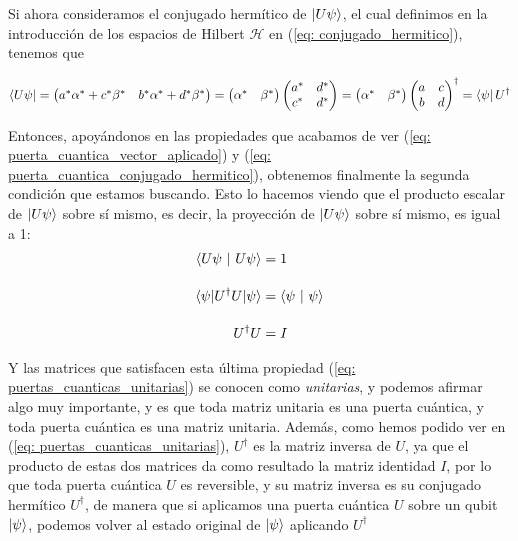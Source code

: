 \documentclass[12pt]{article}
\numberwithin{equation}{section} %
\begin{document}
    \vspace{2.5mm}

    Si ahora consideramos el conjugado hermítico de \( \ket{U \psi} \), el cual definimos en la introducción de los espacios de Hilbert \( \mathcal{H} \) en (\ref{eq: conjugado_hermitico}), tenemos que

    \begin{equation}
        \bra{U \psi} = \begin{pmatrix}
            a^{*} \alpha^{*} + c^{*} \beta^{*} & b^{*} \alpha^{*} + d^{*} \beta^{*} 
        \end{pmatrix} = \begin{pmatrix}
            \alpha^{*} & \beta^{*}
        \end{pmatrix} \begin{pmatrix}
            a^{*} & d^{*} \\
            c^{*} & d^{*}
        \end{pmatrix} = \begin{pmatrix}
            \alpha^{*} & \beta^{*}
        \end{pmatrix} \begin{pmatrix}
            a & c \\
            b & d
        \end{pmatrix} ^ {\dagger} = \bra{\psi} U^{\dagger}
    \label{eq: puerta_cuantica_conjugado_hermitico}
    \end{equation}

    \vspace{2.5mm}

    Entonces, apoyándonos en las propiedades que acabamos de ver (\ref{eq: puerta_cuantica_vector_aplicado}) y (\ref{eq: puerta_cuantica_conjugado_hermitico}), obtenemos finalmente la segunda condición que estamos buscando. Esto lo hacemos viendo que el producto escalar de \( \ket{U \psi} \) sobre sí mismo, es decir, la proyección de \( \ket{U \psi} \) sobre sí mismo, es igual a 1:
    \begin{align}
        \braket{U \psi \ | \ U \psi} &= 1 \nonumber \\[10pt]
        \braket{\psi | U^{\dagger} U | \psi} &= \braket{\psi \ | \ \psi} \nonumber \\[10pt]
        U^{\dagger} U &= I
        \label{eq: puertas_cuanticas_unitarias}
    \end{align}

    Y las matrices que satisfacen esta última propiedad (\ref{eq: puertas_cuanticas_unitarias}) se conocen como \textit{unitarias}, y podemos afirmar algo muy importante, y es que toda matriz unitaria es una puerta cuántica, y toda puerta cuántica es una matriz unitaria. Además, como hemos podido ver en (\ref{eq: puertas_cuanticas_unitarias}), \( U^{\dagger} \) es la matriz inversa de \( U \), ya que el producto de estas dos matrices da como resultado la matriz identidad \( I \), por lo que toda puerta cuántica \( U \) es reversible, y su matriz inversa es su conjugado hermítico \( U^{\dagger} \), de manera que si aplicamos una puerta cuántica \( U \) sobre un qubit \( \ket{\psi} \), podemos volver al estado original de \( \ket{\psi} \) aplicando \( U^{\dagger} \)
\end{document}
